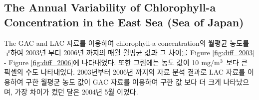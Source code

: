 \subsection{The Annual Variability of Chlorophyll-a Concentration in the East Sea (Sea of Japan)}
 
The GAC and LAC 자료를 이용하여 chlorophyll-a concentration의 월평균 농도를 구하여 2003년 부터 2006년 까지의 매월 월평균 값과 그 차이를 Figure \ref{fig:diff_2003} - Figure \ref{fig:diff_2006}에 나타내었다. 또한 그림에는 농도 값이 10  ${\rm mg/m^3}$ 보다 큰 픽셀의 수도 나타내었다. 2003년부터 2006년 까지의 자료 분석 결과로 LAC 자료를 이용하여 구한 월평균 농도 값이 GAC 자료를 이용하여 구한 값 보다 더 크게 나타났으며, 가장 차이가 컸던 달은 2004년 5월 이었다.
 



